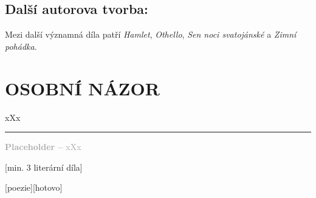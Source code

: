 \documentclass{extarticle} %
\begin{document}
\subsection*{Další autorova tvorba:}
\noindent 
Mezi další významná díla patří \textit{Hamlet}, \textit{Othello}, \textit{Sen noci svatojánské} a \textit{Zimní pohádka}.






\section*{OSOBNÍ NÁZOR}
\noindent 
xXx

\vfill

\noindent\begin{minipage}{\textwidth}
    \textcolor{darkgray}{\rule{\linewidth}{0.4pt}
    \footnotesize
    \textbf{Placeholder --} xXx
    }
\end{minipage}


\newpage

[min. 3 literární díla]


\changefontsize{7pt}

[poezie][hotovo]
\end{document}
